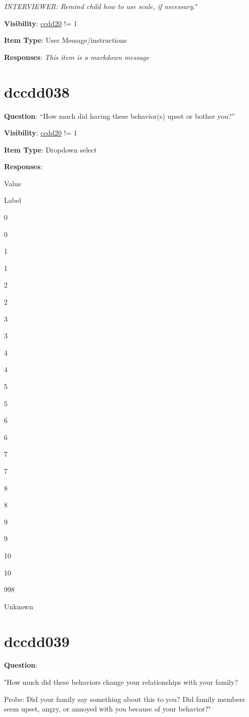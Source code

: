\documentclass[]{book}
\begin{document}
\emph{INTERVIEWER: Remind child how to use scale, if necessary.}"

\textbf{Visibility}: \protect\hyperlink{ccdd20}{ccdd20} != 1

\textbf{Item Type}: User Message/instructions

\textbf{Responses}: \emph{This item is a markdown message}

\hypertarget{dccdd038}{%
\section{dccdd038}\label{dccdd038}}

\textbf{Question}: ``How much did having these behavior(s) upset or bother you?''

\textbf{Visibility}: \protect\hyperlink{ccdd20}{ccdd20} != 1

\textbf{Item Type}: Dropdown select

\textbf{Responses}:

Value

Label

0

0

1

1

2

2

3

3

4

4

5

5

6

6

7

7

8

8

9

9

10

10

998

Unknown

\hypertarget{dccdd039}{%
\section{dccdd039}\label{dccdd039}}

\textbf{Question}:

"How much did these behaviors change your relationships with your family?

Probe: Did your family say something about this to you? Did family members seem upset, angry, or annoyed with you because of your behavior?"
\end{document}
